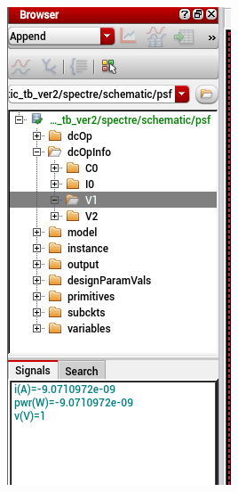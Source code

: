 \begin{figure}[H]
	\begin{minipage}{0.5\linewidth}
		\includegraphics[width=\linewidth]{section/EX1/INV/EX1_INV_Power_Static.png}

\end{minipage}
\end{figure}
